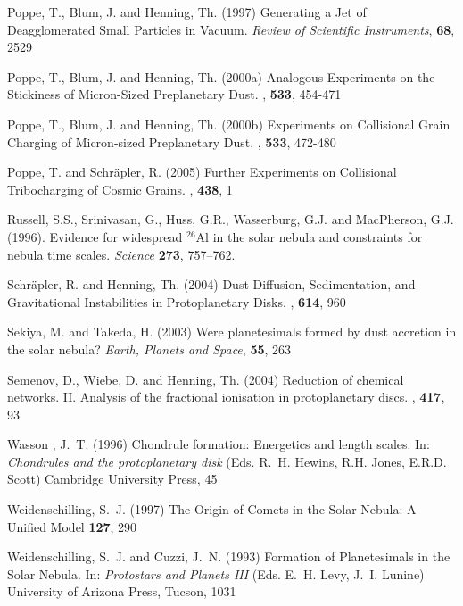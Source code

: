 \begin{literature}
\item Poppe, T., Blum, J. and Henning, Th. (1997) Generating a Jet
of Deagglomerated Small Particles in Vacuum. \textit{Review of
Scientific Instruments\/}, \textbf{68}, 2529

\item Poppe, T., Blum, J. and Henning, Th. (2000a) Analogous
Experiments on the Stickiness of Micron-Sized Preplanetary Dust.
\apj, \textbf{533}, 454-471

\item Poppe, T., Blum, J. and Henning, Th. (2000b) Experiments on
Collisional Grain Charging of Micron-sized Preplanetary Dust.
\apj, \textbf{533}, 472-480

\item Poppe, T. and Schr\"apler, R. (2005) Further Experiments on
Collisional Tribocharging of Cosmic Grains. \aap, \textbf{438}, 1

\item Russell, S.S., Srinivasan, G., Huss, G.R., Wasserburg, G.J. 
and MacPherson, G.J. (1996).  Evidence for widespread $^{26}$Al in the solar
nebula and constraints for nebula time scales.  \textit{Science}
\textbf{273}, 757--762.

\item Schr\"apler, R. and Henning, Th. (2004) Dust Diffusion,
Sedimentation, and Gravitational Instabilities in Protoplanetary
Disks. \apj, \textbf{614}, 960

\item Sekiya, M. and Takeda, H. (2003) Were planetesimals formed
by dust accretion in the solar nebula? \textit{Earth, Planets and
Space\/}, \textbf{55}, 263

\item Semenov, D., Wiebe, D. and Henning, Th. (2004) Reduction of
chemical networks. II. Analysis of the fractional ionisation in
protoplanetary discs. \aap, \textbf{417}, 93

\item Wasson , J.~T. (1996) Chondrule formation: Energetics and
length scales. In: \textit{Chondrules and the protoplanetary disk}
(Eds. R.~H. Hewins, R.H. Jones, E.R.D. Scott) Cambridge University
Press, 45

\item Weidenschilling, S.~J. (1997) The Origin of Comets in the
Solar Nebula: A Unified Model \ica \textbf{127}, 290

\item Weidenschilling, S.~J. and Cuzzi, J.~N. (1993) Formation of
Planetesimals in the Solar Nebula. In: \textit{Protostars and
Planets III} (Eds. E.~H. Levy, J.~I. Lunine) University of Arizona
Press, Tucson, 1031


\end{literature}
